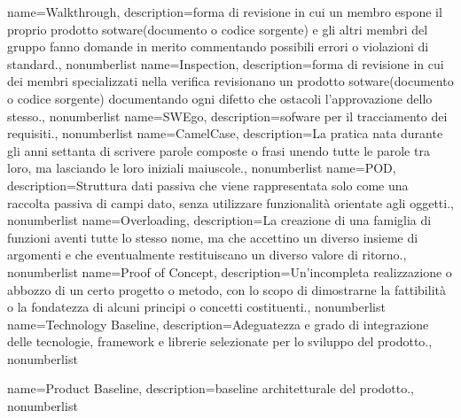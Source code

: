 {
	name={Walkthrough},
	description={forma di revisione in cui un membro espone il proprio prodotto sotware(documento o codice sorgente) e gli altri membri del gruppo fanno domande in merito commentando possibili errori o violazioni di standard.}, 
	nonumberlist 
}
{
	name={Inspection},
	description={forma di revisione in cui dei membri specializzati nella verifica revisionano un prodotto sotware(documento o codice sorgente) documentando ogni difetto che ostacoli l'approvazione dello stesso.}, 
	nonumberlist 
}
{
	name={SWEgo},
	description={sofware per il tracciamento dei requisiti.}, 
	nonumberlist 
}
{
name={CamelCase},
description={La pratica nata durante gli anni settanta di scrivere parole composte o frasi unendo tutte le parole tra loro, ma lasciando le loro iniziali maiuscole.}, 
nonumberlist 
}
{
name={POD},
description={Struttura dati passiva che viene rappresentata solo come una raccolta passiva di campi dato, senza utilizzare funzionalità orientate agli oggetti.}, 
nonumberlist 
}
{
name={Overloading},
description={La creazione di una famiglia di funzioni aventi tutte lo stesso nome, ma che accettino un diverso insieme di argomenti e che eventualmente restituiscano un diverso valore di ritorno.}, 
nonumberlist 
}
{
	name={Proof of Concept},
	description={Un'incompleta realizzazione o abbozzo di un certo progetto o metodo, con lo scopo di dimostrarne la fattibilità o la fondatezza di alcuni principi o concetti costituenti.}, 
	nonumberlist 
}
{
	name={Technology Baseline},
	description={Adeguatezza e grado di integrazione delle tecnologie, framework e librerie selezionate per lo sviluppo del prodotto.}, 
	nonumberlist 
}

{
	name={Product Baseline},
	description={baseline architetturale del prodotto.}, 
	nonumberlist 
}